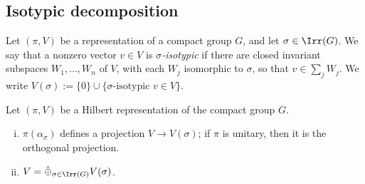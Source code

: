 \documentclass[reqno]{amsart} 
\begin{document}
\subsection{Isotypic decomposition}\label{sec:isotyp-decomp}

\begin{definition}
  Let $(\pi,V)$ be a representation of a compact group $G$, and let $\sigma \in \Irr(G)$.  We say that a nonzero vector $v \in V$ is \emph{$\sigma$-isotypic} if there are closed invariant subspaces $W_1,\dotsc,W_n$ of $V$, with each $W_j$ isomorphic to $\sigma$, so that $v \in \sum_{j} W_j$.  We write $V(\sigma) := \{0\} \cup \{\text{$\sigma$-isotypic } v \in V\}$.
\end{definition}

\begin{theorem}\label{thm:isotyp-decomp-1}
  Let $(\pi,V)$ be a Hilbert representation of the compact group $G$.
  \begin{enumerate}
[(i)]
  \item $\pi(\alpha_\sigma)$ defines a projection $V \rightarrow V(\sigma)$; if $\pi$ is unitary, then it is the orthogonal projection.
  \item $V = \hat{\oplus }_{\sigma \in \Irr(G)} V(\sigma)$.
  \end{enumerate}
\end{theorem}
\end{document}
